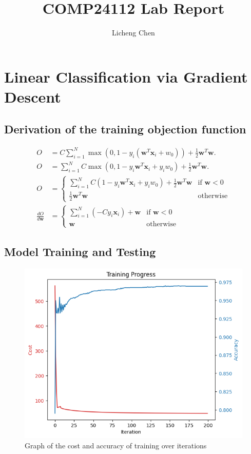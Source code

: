 \documentclass[a4paper]{article}
\title{COMP24112 Lab Report}
\author{Licheng Chen}
\begin{document}
\maketitle
\newpage
\section{Linear Classification via Gradient Descent}

\subsection{Derivation of the training objection function}

\begin{align*}
    O                      & = C \sum^N_{i=1}\max\left(0, 1 - y_i \left(\mathbf{w}^T\mathbf{x}_i + w_0\right)\right) + \frac{1}{2}\mathbf{w}^T\mathbf{w}. \\
    O                      & = \sum^N_{i=1}C\max\left(0, 1 - y_i\mathbf{w}^T\mathbf{x}_i + y_iw_0\right) + \frac{1}{2}\mathbf{w}^T\mathbf{w}.             \\
    O                      & =
    \begin{cases}
        \sum^N_{i=1}C(1 - y_i\mathbf{w}^T\mathbf{x}_i + y_iw_0) + \frac{1}{2}\mathbf{w}^T\mathbf{w} & \text{if } \mathbf{w} < 0 \\
        \frac{1}{2}\mathbf{w}^T\mathbf{w}                                                           & \text{otherwise}
    \end{cases}                               \\
    \frac{dO}{d\mathbf{w}} & =
    \begin{cases}
        \sum^N_{i=1}(-Cy_i\mathbf{x}_i) + \mathbf{w} & \text{if } \mathbf{w} < 0 \\
        \mathbf{w}                                   & \text{otherwise}
    \end{cases}
\end{align*}



\subsection{Model Training and Testing}
\begin{figure}[htbp]
    \centering
    \includegraphics[width=0.5\linewidth]{1.11.png}
    \caption{\centering Graph of the cost and accuracy of training over iterations}
\end{figure}
\end{document}
